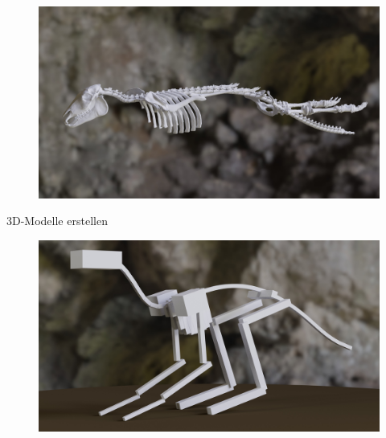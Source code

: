 \documentclass{beamer}
\begin{document}
\begin{frame}[focus]
 \begin{figure}
  \centering
  \includegraphics[width=\textwidth]{../../java_skeleton_generation/example_skeletons/fish.jpg}
 \end{figure}
\end{frame}

\begin{frame}[focus]
\begin{flushleft}
  \Large 3D-Modelle erstellen
 \end{flushleft}
 \vfill
 \begin{figure}
  \centering
  \includegraphics[width=\textwidth]{../../java_skeleton_generation/example_skeletons/4legs_boxes.jpg}
 \end{figure}
\end{frame}
\end{document}
